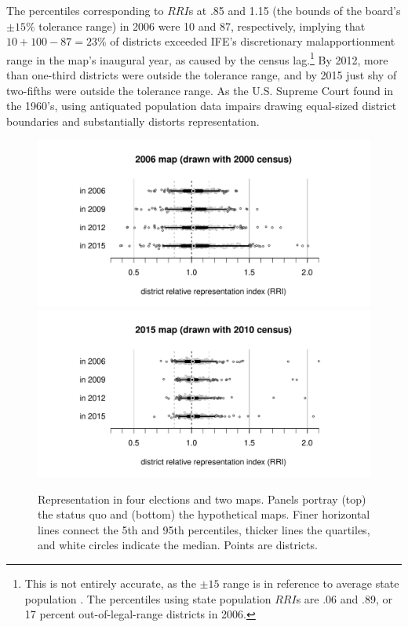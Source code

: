 \documentclass[letter,12pt]{article}
\begin{document}
The percentiles corresponding to $RRI$s at .85 and 1.15 (the bounds of the board's $\pm15\%$ tolerance range) in 2006 were 10 and 87, respectively, implying that $10+100-87=23\%$ of districts exceeded IFE's discretionary malapportionment range in the map's inaugural year, as caused by the census lag.\footnote{This is not entirely accurate, as the $\pm15$ range is in reference to average state population \citep[not average national population, analyzed here, see][]{altman.magar.mcd.trelles2014apsa}. The percentiles using state population $RRI$s are .06 and .89, or 17 percent out-of-legal-range districts in 2006.} By 2012, more than one-third districts were outside the tolerance range, and by 2015 just shy of two-fifths were outside the tolerance range. As the U.S. Supreme Court found in the 1960's, using antiquated population data impairs drawing equal-sized district boundaries and substantially distorts representation. 

\begin{figure}
\begin{center}
    \includegraphics[width=.65\columnwidth]{rrin0615d0.pdf} \\
    \includegraphics[width=.65\columnwidth]{rrin0615d3.pdf} \\
\caption{Representation in four elections and two maps. Panels portray (top) the status quo and (bottom) the hypothetical maps. Finer horizontal lines connect the 5th and 95th percentiles, thicker lines the quartiles, and white circles indicate the median. Points are districts.}\label{F:malapp}
\end{center}
\end{figure}
\end{document}
